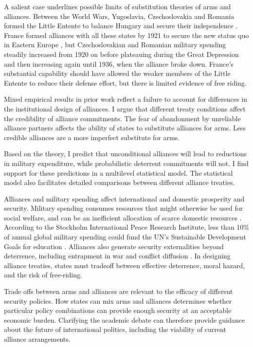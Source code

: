 \documentclass[12pt]{article}
\begin{document}
A salient case underlines possible limits of substitution theories of arms and alliances. Between the World Wars, Yugoslavia, Czechoslovakia and Romania formed the Little Entente to balance Hungary and secure their independence \citep{Benes1922, Osusky1934}. France formed alliances with all these states by 1921 to secure the new status quo in Eastern Europe \citep[pg. 142-3]{Crane1931}, but Czechoslovakian and Romanian military spending steadily increased from 1920 on before plateauing during the Great Depression and then increasing again until 1936, when the alliance broke down. France's substantial capability should have allowed the weaker members of the Little Entente to reduce their defense effort, but there is limited evidence of free riding. 

Mixed empirical results in prior work reflect a failure to account for differences in the institutional design of alliances. I argue that different treaty conditions affect the credibility of alliance commitments. The fear of abandonment by unreliable alliance partners affects the ability of states to substitute alliances for arms. Less credible alliances are a more imperfect substitute for arms. 

Based on the theory, I predict that unconditional alliances will lead to reductions in military expenditure, while probabilistic deterrent commitments will not. I find support for these predictions in a multilevel statistical model. The statistical model also facilitates detailed comparisons between different alliance treaties. 
 
Alliances and military spending affect international and domestic prosperity and security. Military spending consumes resources that might otherwise be used for social welfare, and can be an inefficient allocation of scarce domestic resources \citep{DegerSen1995}. According to the Stockholm International Peace Research Institute, less than 10\% of annual global military spending could fund the UN's Sustainable Development Goals for education \citep{SIPRI2016}. Alliances also generate security externalities beyond deterrence, including entrapment in war \citep{Snyder1984} and conflict diffusion \citep{MelinKoch2010}. In designing alliance treaties, states must tradeoff between effective deterrence, moral hazard, and the risk of free-riding. 

Trade offs between arms and alliances are relevant to the efficacy of different security policies. How states can mix arms and alliances determines whether particular policy combinations can provide enough security at an acceptable economic burden. Clarifying the academic debate can therefore provide guidance about the future of international politics, including the viability of current alliance arrangements. 
\end{document}
